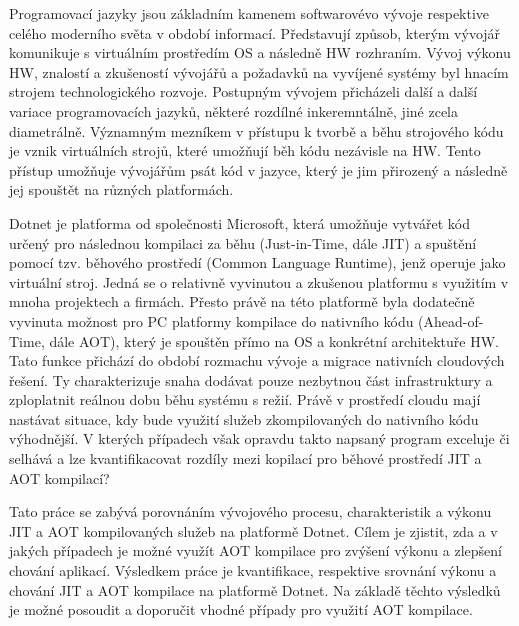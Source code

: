 Programovací jazyky jsou základním kamenem softwarovévo vývoje respektive celého moderního světa v období informací. Představují způsob, kterým vývojář komunikuje s virtuálním prostředím OS a následně HW rozhraním. Vývoj výkonu HW, znalostí a zkušeností vývojářů a požadavků na vyvíjené systémy byl hnacím strojem technologického rozvoje. Postupným vývojem přicházeli další a další variace programovacích jazyků, některé rozdílné inkeremntálně, jiné zcela diametrálně. Významným mezníkem v přístupu k tvorbě a běhu strojového kódu je vznik virtuálních strojů, které umožňují běh kódu nezávisle na HW. Tento přístup umožňuje vývojářům psát kód v jazyce, který je jim přirozený a následně jej spouštět na různých platformách.

Dotnet je platforma od společnosti Microsoft, která umožňuje vytvářet kód určený pro následnou kompilaci za běhu (Just-in-Time, dále JIT) a spuštění pomocí tzv. běhového prostředí (Common Language Runtime), jenž operuje jako virtuální stroj. Jedná se o relativně vyvinutou a zkušenou platformu s využitím v mnoha projektech a firmách. Přesto právě na této platformě byla dodatečně vyvinuta možnost pro PC platformy kompilace do nativního kódu (Ahead-of-Time, dále AOT), který je spouštěn přímo na OS a konkrétní architektuře HW. Tato funkce přichází do období rozmachu vývoje a migrace nativních cloudových řešení. Ty charakterizuje snaha dodávat pouze nezbytnou část infrastruktury a zploplatnit reálnou dobu běhu systému s režií. Právě v prostředí cloudu mají nastávat situace, kdy bude využití služeb zkompilovaných do nativního kódu výhodnější. V kterých případech však opravdu takto napsaný program exceluje či selhává a lze kvantifikacovat rozdíly mezi kopilací pro běhové prostředí JIT a AOT kompilací?

Tato práce se zabývá porovnáním vývojového procesu, charakteristik a výkonu JIT a AOT kompilovaných služeb na platformě Dotnet. Cílem je zjistit, zda a v jakých případech je možné využít AOT kompilace pro zvýšení výkonu a zlepšení chování aplikací. Výsledkem práce je kvantifikace, respektive srovnání výkonu a chování JIT a AOT kompilace na platformě Dotnet. Na základě těchto výsledků je možné posoudit a doporučit vhodné případy pro využití AOT kompilace.